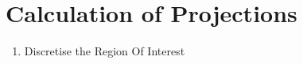 \section{Calculation of Projections}%
\label{sec:calculation_of_projections}

\begin{enumerate}
    \item Discretise the Region Of Interest
\end{enumerate}












